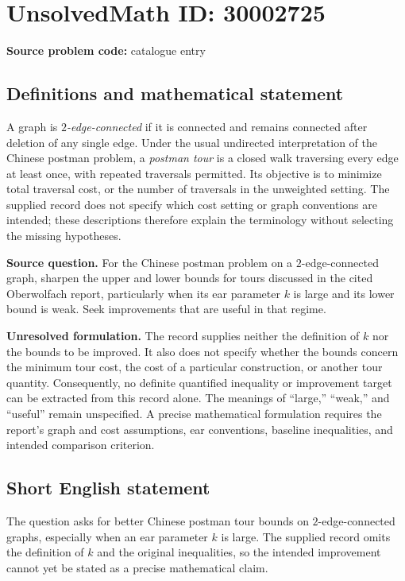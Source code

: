 \documentclass[11pt]{article}
\begin{document}
\section*{UnsolvedMath ID: 30002725}
\textbf{Source problem code:} catalogue entry
\subsection{Definitions and mathematical statement}
A graph is \emph{$2$-edge-connected} if it is connected and remains connected after deletion of any single edge. Under the usual undirected interpretation of the Chinese postman problem, a \emph{postman tour} is a closed walk traversing every edge at least once, with repeated traversals permitted. Its objective is to minimize total traversal cost, or the number of traversals in the unweighted setting. The supplied record does not specify which cost setting or graph conventions are intended; these descriptions therefore explain the terminology without selecting the missing hypotheses.

\textbf{Source question.} For the Chinese postman problem on a $2$-edge-connected graph, sharpen the upper and lower bounds for tours discussed in the cited Oberwolfach report, particularly when its ear parameter $k$ is large and its lower bound is weak. Seek improvements that are useful in that regime.

\textbf{Unresolved formulation.} The record supplies neither the definition of $k$ nor the bounds to be improved. It also does not specify whether the bounds concern the minimum tour cost, the cost of a particular construction, or another tour quantity. Consequently, no definite quantified inequality or improvement target can be extracted from this record alone. The meanings of ``large,'' ``weak,'' and ``useful'' remain unspecified. A precise mathematical formulation requires the report's graph and cost assumptions, ear conventions, baseline inequalities, and intended comparison criterion.
\subsection{Short English statement}
The question asks for better Chinese postman tour bounds on $2$-edge-connected graphs, especially when an ear parameter $k$ is large. The supplied record omits the definition of $k$ and the original inequalities, so the intended improvement cannot yet be stated as a precise mathematical claim.
\end{document}
